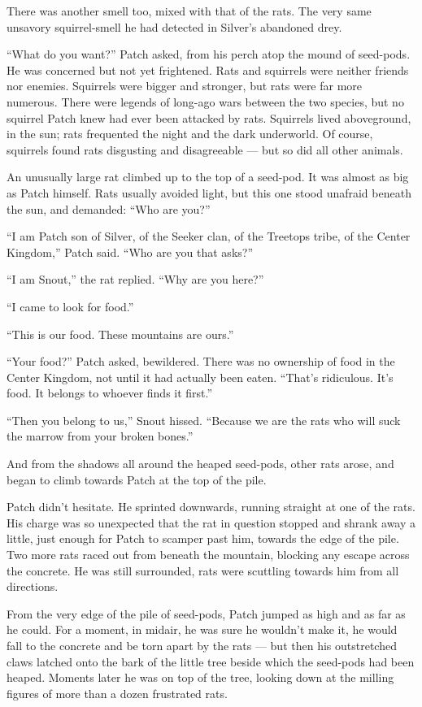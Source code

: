 \documentclass[ebook,oneside,openany,17pt]{memoir}
\newenvironment{tolerant}[1]{%
  \par\tolerance=#1\relax
}{%
  \par
}
\begin{document}
There was another smell too, mixed with that of the rats. The very
same unsavory squirrel-smell he had detected in Silver’s abandoned
drey.

\begin{tolerant}{1500}
“What do you want?” Patch asked, from his perch atop the mound of
seed-pods. He was concerned but not yet frightened. Rats and squirrels
were neither friends nor enemies. Squirrels were bigger and stronger,
but rats were far more numerous. There were legends of long-ago wars
between the two species, but no squirrel Patch knew had ever been
attacked by rats. Squirrels lived aboveground, in the sun; rats
frequented the night and the dark underworld. Of course, squirrels
found rats disgusting and disagreeable — but so did all other animals.
\end{tolerant}

An unusually large rat climbed up to the top of a seed-pod. It was
almost as big as Patch himself. Rats usually avoided light, but this
one stood unafraid beneath the sun, and demanded: “Who are you?”

“I am Patch son of Silver, of the Seeker clan, of the Treetops tribe,
of the Center Kingdom,” Patch said. “Who are you that asks?”

“I am Snout,” the rat replied. “Why are you here?”

“I came to look for food.”

“This is our food. These mountains are ours.”

“Your food?” Patch asked, bewildered. There was no ownership of food
in the Center Kingdom, not until it had actually been eaten. “That’s
ridiculous. It’s food. It belongs to whoever finds it first.”

“Then you belong to us,” Snout hissed. “Because we are the rats who
will suck the marrow from your broken bones.”

And from the shadows all around the heaped seed-pods, other rats
arose, and began to climb towards Patch at the top of the pile.

Patch didn’t hesitate. He sprinted downwards, running straight at one
of the rats. His charge was so unexpected that the rat in question
stopped and shrank away a little, just enough for Patch to scamper
past him, towards the edge of the pile. Two more rats raced out from
beneath the mountain, blocking any escape across the concrete. He was
still surrounded, rats were scuttling towards him from all directions.

\begin{tolerant}{1000}
From the very edge of the pile of seed-pods, Patch jumped as high and
as far as he could. For a moment, in midair, he was sure he wouldn’t
make it, he would fall to the concrete and be torn apart by the rats —
but then his outstretched claws latched onto the bark of the little
tree beside which the seed-pods had been heaped. Moments later he was
on top of the tree, looking down at the milling figures of more than a
dozen frustrated rats.
\end{tolerant}
\end{document}
